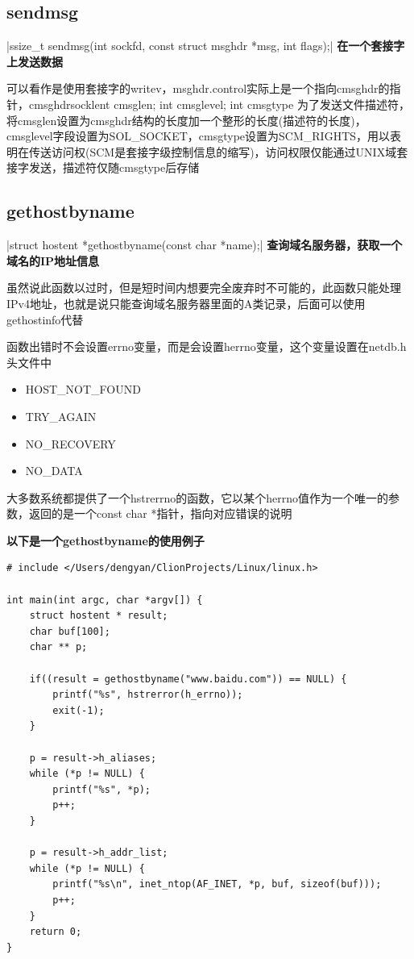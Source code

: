 \subsection{sendmsg}
|ssize_t sendmsg(int sockfd, const struct msghdr *msg, int flags);|
\noindent \textbf{在一个套接字上发送数据}
\begin{spacing}{2.0}
可以看作是使用套接字的writev，msghdr.control实际上是一个指向cmsghdr的指针，cmsghdr{socklen\li t cmsg\li len; int cmsg\li level; int cmsg\li type} 为了发送文件描述符，将cmsg\li len设置为cmsghdr结构的长度加一个整形的长度(描述符的长度)，cmsg\li level字段设置为SOL\_SOCKET，cmsg\li type设置为SCM\_RIGHTS，用以表明在传送访问权(SCM是套接字级控制信息的缩写)，访问权限仅能通过UNIX域套接字发送，描述符仅随cmsg\li type后存储

\end{spacing}
\newpage

\subsection{gethostbyname}
|struct hostent *gethostbyname(const char *name);|
\noindent \textbf{查询域名服务器，获取一个域名的IP地址信息}
\begin{spacing}{2.0}
虽然说此函数以过时，但是短时间内想要完全废弃时不可能的，此函数只能处理IPv4地址，也就是说只能查询域名服务器里面的A类记录，后面可以使用gethostinfo代替

函数出错时不会设置errno变量，而是会设置h\li errno变量，这个变量设置在netdb.h头文件中

\begin{itemize}
	\item HOST\_NOT\_FOUND
	\item TRY\_AGAIN
	\item NO\_RECOVERY
	\item NO\_DATA
\end{itemize}
大多数系统都提供了一个hstrerrno的函数，它以某个h\li errno值作为一个唯一的参数，返回的是一个const char *指针，指向对应错误的说明
\end{spacing}
\textbf{以下是一个gethostbyname的使用例子}
\begin{verbatim}
# include </Users/dengyan/ClionProjects/Linux/linux.h>

int main(int argc, char *argv[]) {
    struct hostent * result;
    char buf[100];
    char ** p;

    if((result = gethostbyname("www.baidu.com")) == NULL) {
        printf("%s", hstrerror(h_errno));
        exit(-1);
    }

    p = result->h_aliases;
    while (*p != NULL) {
        printf("%s", *p);
        p++;
    }

    p = result->h_addr_list;
    while (*p != NULL) {
        printf("%s\n", inet_ntop(AF_INET, *p, buf, sizeof(buf)));
        p++;
    }
    return 0;
}
\end{verbatim}
\newpage

